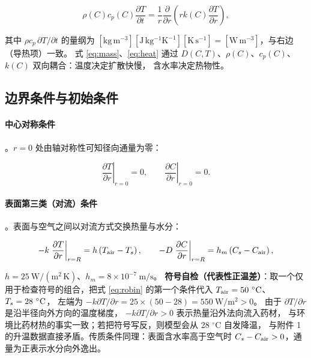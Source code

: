 \begin{equation}
\rho(C)c_p(C)\frac{\partial T}{\partial t}
=\frac{1}{r}\frac{\partial}{\partial r}\left(rk(C)\frac{\partial T}{\partial r}\right),
\label{eq:heat}
\end{equation}

其中 $\rho c_p\,\partial T/\partial t$ 的量纲为
$[\mathrm{kg\,m^{-3}}][\mathrm{J\,kg^{-1}K^{-1}}][\mathrm{K\,s^{-1}}]
=[\mathrm{W\,m^{-3}}]$，与右边（导热项）一致。
式 \eqref{eq:mass}、\eqref{eq:heat} 通过
$D(C,T)$、$\rho(C)$、$c_p(C)$、$k(C)$ 双向耦合：温度决定扩散快慢，
含水率决定热物性。

\subsection{边界条件与初始条件}

\paragraph{中心对称条件}。$r=0$ 处由轴对称性可知径向通量为零：

\begin{equation}
\left.\frac{\partial T}{\partial r}\right|_{r=0}=0,\qquad
\left.\frac{\partial C}{\partial r}\right|_{r=0}=0 .
\end{equation}

\paragraph{表面第三类（对流）条件}。表面与空气之间以对流方式交换热量与水分：

\begin{equation}
-k\left.\frac{\partial T}{\partial r}\right|_{r=R}=h\left(T_{\mathrm{air}}-T_{s}\right),
\qquad
-D\left.\frac{\partial C}{\partial r}\right|_{r=R}=h_m\left(C_{s}-C_{\mathrm{air}}\right),
\label{eq:robin}
\end{equation}

$h=25\ \mathrm{W/(m^2\,K)}$、$h_m=8\times10^{-7}\ \mathrm{m/s}$。
\textbf{符号自检（代表性正温差）}：取一个仅用于检查符号的组合，把式
\eqref{eq:robin} 的第一个条件代入
$T_{\mathrm{air}}=50\ ^\circ\mathrm{C}$、$T_{s}=28\ ^\circ\mathrm{C}$，
左端为 $-k\partial T/\partial r=25\times(50-28)=550\ \mathrm{W/m^2}>0$。
由于 $\partial T/\partial r$ 是沿半径向外方向的温度梯度，
$-k\partial T/\partial r>0$ 表示热量沿外法向流入药材，
与环境比药材热的事实一致；若把符号写反，则模型会从 28 $^\circ$C 自发降温，
与附件 1 的升温数据直接矛盾。传质条件同理：表面含水率高于空气时
$C_{s}-C_{\mathrm{air}}>0$，通量为正表示水分向外逸出。

